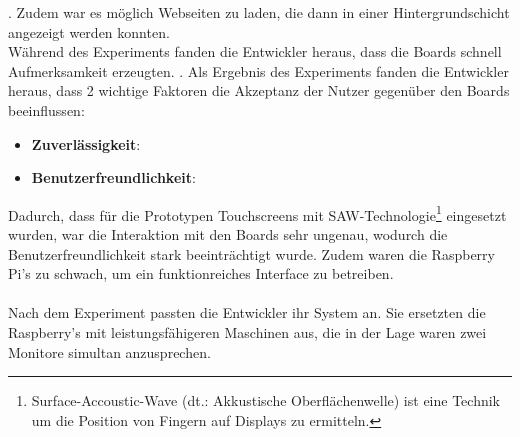 \cite{wood:2014}. Zudem war es möglich Webseiten zu laden, die dann in einer Hintergrundschicht angezeigt werden konnten.
\\
Während des Experiments fanden die Entwickler heraus, dass die Boards schnell Aufmerksamkeit erzeugten. \cite{wood:2014}.
Als Ergebnis des Experiments fanden die Entwickler heraus, dass 2 wichtige Faktoren die Akzeptanz der Nutzer gegenüber den Boards beeinflussen:
\begin{itemize}
  \item \textbf{Zuverlässigkeit}: \cite{wood:2014}
  \item \textbf{Benutzerfreundlichkeit}: \cite{wood:2014}
\end{itemize}
Dadurch, dass für die Prototypen Touchscreens mit SAW-Technologie\footnote{Surface-Accoustic-Wave (dt.: Akkustische Oberflächenwelle) ist eine Technik um die Position von Fingern auf Displays zu ermitteln.} eingesetzt wurden, war die Interaktion mit den Boards sehr ungenau, wodurch die Benutzerfreundlichkeit stark beeinträchtigt wurde.
Zudem waren die Raspberry Pi's zu schwach, um ein funktionreiches Interface zu betreiben.
\\
\\
Nach dem Experiment passten die Entwickler ihr System an.
Sie ersetzten die Raspberry's mit leistungsfähigeren Maschinen aus, die in der Lage waren zwei Monitore simultan anzusprechen.
\\

\todo





